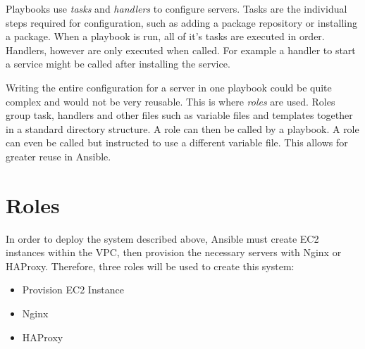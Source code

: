 \documentclass[a4paper]{article}
\begin{document}
    Playbooks use \textit{tasks} and \textit{handlers} to configure servers. Tasks are the individual steps required for configuration, such as adding a package repository or installing a package. When a playbook is run, all of it's tasks are executed in order. Handlers, however are only executed when called. For example a handler to start a service might be called after installing the service.
  
    Writing the entire configuration for a server in one playbook could be quite complex and would not be very reusable. This is where \textit{roles} are used. Roles group task, handlers and other files such as variable files and templates together in a standard directory structure. A role can then be called by a playbook. A role can even be called but instructed to use a different variable file. This allows for greater reuse in Ansible. 
  
  \section{Roles}
  In order to deploy the system described above, Ansible must create EC2 instances within the VPC, then provision the necessary servers with Nginx or HAProxy. Therefore, three roles will be used to create this system:
  
  \begin{itemize}
    \item Provision EC2 Instance
    \item Nginx
    \item HAProxy
  \end{itemize}
  
\end{document}
